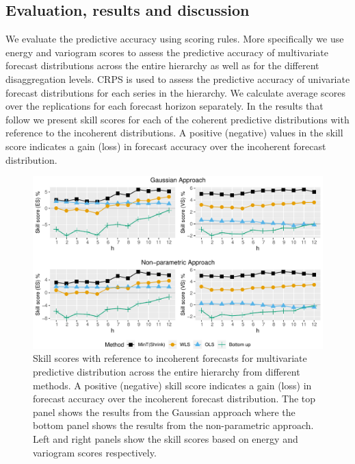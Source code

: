 \documentclass[12pt]{article}
\theoremstyle{definition}
\begin{document}
\subsection{Evaluation, results and discussion}

We evaluate the predictive accuracy using scoring rules. More specifically we use energy and variogram scores to assess the predictive accuracy of multivariate forecast distributions across the entire hierarchy as well as for the different disaggregation levels. CRPS is used to assess the predictive accuracy of univariate forecast distributions for each series in the hierarchy. We calculate average scores over the replications for each forecast horizon separately. In the results that follow we present skill scores for each of the coherent predictive distributions with reference to the incoherent distributions. A positive (negative) values in the skill score indicates a gain (loss) in forecast accuracy over the incoherent forecast distribution.

\begin{figure}
	\centering
	\small
	\includegraphics[width= .95\textwidth]{Empirical-results/AllTS_MultiVScores_ARIMA.pdf}
	\caption{Skill scores with reference to incoherent forecasts for multivariate predictive distribution across the entire hierarchy from different methods. A positive (negative) skill score indicates a gain (loss) in forecast accuracy over the incoherent forecast distribution. The top panel shows the results from the Gaussian approach where the bottom panel shows the results from the non-parametric approach. Left and right panels show the skill scores based on energy and variogram scores respectively.}\label{fig:EmpResults_AllTS}
\end{figure}
\end{document}
